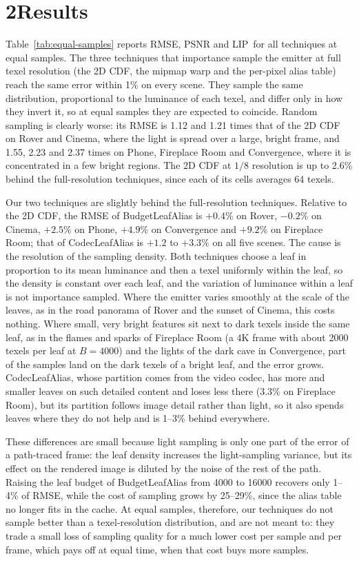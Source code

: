 \documentclass[10pt]{article}
\newcommand{\FLIP}{\protect\reflectbox{F}LIP}
\begin{document}
\section*{2\quad Results}

Table~\ref{tab:equal-samples} reports RMSE, PSNR and \FLIP\ for all techniques at equal samples. The three techniques that importance sample the emitter at full texel resolution (the 2D CDF, the mipmap warp and the per-pixel alias table) reach the same error within 1\% on every scene. They sample the same distribution, proportional to the luminance of each texel, and differ only in how they invert it, so at equal samples they are expected to coincide. Random sampling is clearly worse: its RMSE is 1.12 and 1.21 times that of the 2D CDF on Rover and Cinema, where the light is spread over a large, bright frame, and 1.55, 2.23 and 2.37 times on Phone, Fireplace Room and Convergence, where it is concentrated in a few bright regions. The 2D CDF at $1/8$ resolution is up to 2.6\% behind the full-resolution techniques, since each of its cells averages 64 texels.

Our two techniques are slightly behind the full-resolution techniques. Relative to the 2D CDF, the RMSE of BudgetLeafAlias is $+0.4\%$ on Rover, $-0.2\%$ on Cinema, $+2.5\%$ on Phone, $+4.9\%$ on Convergence and $+9.2\%$ on Fireplace Room; that of CodecLeafAlias is $+1.2$ to $+3.3\%$ on all five scenes. The cause is the resolution of the sampling density. Both techniques choose a leaf in proportion to its mean luminance and then a texel uniformly within the leaf, so the density is constant over each leaf, and the variation of luminance within a leaf is not importance sampled. Where the emitter varies smoothly at the scale of the leaves, as in the road panorama of Rover and the sunset of Cinema, this costs nothing. Where small, very bright features sit next to dark texels inside the same leaf, as in the flames and sparks of Fireplace Room (a 4K frame with about 2000 texels per leaf at $B=4000$) and the lights of the dark cave in Convergence, part of the samples land on the dark texels of a bright leaf, and the error grows. CodecLeafAlias, whose partition comes from the video codec, has more and smaller leaves on such detailed content and loses less there (3.3\% on Fireplace Room), but its partition follows image detail rather than light, so it also spends leaves where they do not help and is 1--3\% behind everywhere.

These differences are small because light sampling is only one part of the error of a path-traced frame: the leaf density increases the light-sampling variance, but its effect on the rendered image is diluted by the noise of the rest of the path. Raising the leaf budget of BudgetLeafAlias from 4000 to 16000 recovers only 1--4\% of RMSE, while the cost of sampling grows by 25--29\%, since the alias table no longer fits in the cache. At equal samples, therefore, our techniques do not sample better than a texel-resolution distribution, and are not meant to: they trade a small loss of sampling quality for a much lower cost per sample and per frame, which pays off at equal time, when that cost buys more samples.


\end{document}
